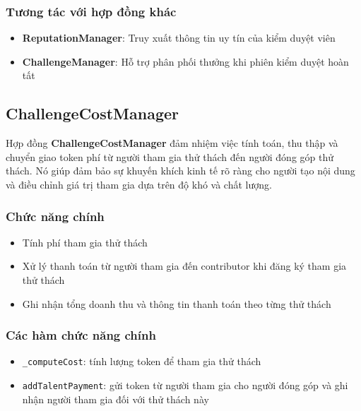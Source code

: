 \subsubsection{Tương tác với hợp đồng khác}

\begin{itemize}
  \item \textbf{ReputationManager}: Truy xuất thông tin uy tín của kiểm duyệt viên
  \item \textbf{ChallengeManager}: Hỗ trợ phân phối thưởng khi phiên kiểm duyệt hoàn tất
\end{itemize}

\subsection{ChallengeCostManager}

Hợp đồng \textbf{ChallengeCostManager} đảm nhiệm việc tính toán, thu thập và chuyển giao token phí từ người tham gia thử thách đến người đóng góp thử thách. 
Nó giúp đảm bảo sự khuyến khích kinh tế rõ ràng cho người tạo nội dung và điều chỉnh giá trị tham gia dựa trên độ khó và chất lượng.

\subsubsection{Chức năng chính}

\begin{itemize}
  \item Tính phí tham gia thử thách
  \item Xử lý thanh toán từ người tham gia đến contributor khi đăng ký tham gia thử thách
  \item Ghi nhận tổng doanh thu và thông tin thanh toán theo từng thử thách
\end{itemize}

\subsubsection{Các hàm chức năng chính}

\begin{itemize}
  \item \texttt{\_computeCost}: tính lượng token để tham gia thử thách
  \item \texttt{addTalentPayment}: gửi token từ người tham gia cho người đóng góp và ghi nhận người tham gia đối với thử thách này
\end{itemize}

